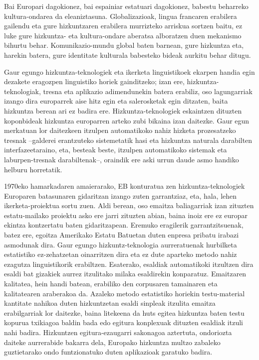 \begin{multicols}{2}
Bai Europari dagokionez, bai espainiar estatuari dagokionez, babestu beharreko kultura-ondarea da eleaniztasuna. Globalizazioak, lingua francaren erabilera gailendu eta gure hizkuntzaren erabilera murrizteko arriskua sortzen baitu, ez luke gure hizkuntza- eta kultura-ondare aberatsa alboratzen duen mekanismo bihurtu behar. Komunikazio-mundu global baten barnean, gure hizkuntza eta, harekin batera, gure identitate kulturala babesteko bideak aurkitu behar ditugu.

Gaur egungo hizkuntza-teknologiek eta ikerketa linguistikoek ekarpen handia egin dezakete eragozpen linguistiko horiek gainditzeko; izan ere, hizkuntza-teknologiak, tresna eta aplikazio adimendunekin batera erabiliz, oso lagungarriak izango dira europarrek aise hitz egin eta salerosketak egin ditzaten, baita hizkuntza berean ari ez badira ere. Hizkuntza-teknologiek eskaintzen dituzten koponbideak hizkuntza europarren arteko zubi bikaina izan daitezke. Gaur egun merkatuan lor daitezkeen itzulpen automatikoko nahiz hizketa prozesatzeko tresnak –galderei erantzuteko sistemetatik hasi eta hizkuntza naturala darabilten interfazeetaraino, eta, besteak beste, itzulpen automatikoko sistemak eta laburpen-tresnak darabiltenak–, oraindik ere aski urrun daude asmo handiko helburu horretatik.


1970eko hamarkadaren amaierarako, EB konturatua zen hizkuntza-teknologiek Europaren batasunaren gidaritzan izango zuten garrantziaz, eta, hala, lehen ikerketa-proiektua sortu zuen. Aldi berean, oso emaitza baliagarriak izan zituzten estatu-mailako proiektu asko ere jarri zituzten abian, baina inoiz ere ez europar ekintza kontzertatu baten gidaritzapean. Eremuko eragilerik garrantzitsuenak, batez ere, egoitza Amerikako Estatu Batuetan duten enpresa pribatu irabazi asmodunak dira. Gaur egungo hizkuntz-teknologia aurreratuenak hurbilketa estatistiko ez-zehatzetan oinarritzen dira eta ez dute aparteko metodo nahiz ezagutza linguistikorik erabiltzen. Esaterako, esaldiak automatikoki itzultzen dira esaldi bat gizakiek aurrez itzulitako milaka esaldirekin konparatuz. Emaitzaren kalitatea, hein handi batean, erabiliko den corpusaren tamainaren eta kalitatearen araberakoa da. Azaleko metodo estatistiko horiekin testu-material kantitate nahikoa duten hizkuntzetan esaldi sinpleak itzulita emaitza erabilgarriak lor daitezke, baina litekeena da huts egitea hizkuntza baten testu kopurua txikiagoa baldin bada edo egitura konplexuak dituzten esaldiak itzuli nahi badira. Hizkuntzen egitura-ezaugarri sakonagoa aztertuta, ondoriozta daiteke aurrerabide bakarra dela, Europako hizkuntza multzo zabaleko guztietarako ondo funtzionatuko duten aplikazioak garatuko badira.


\end{multicols}
